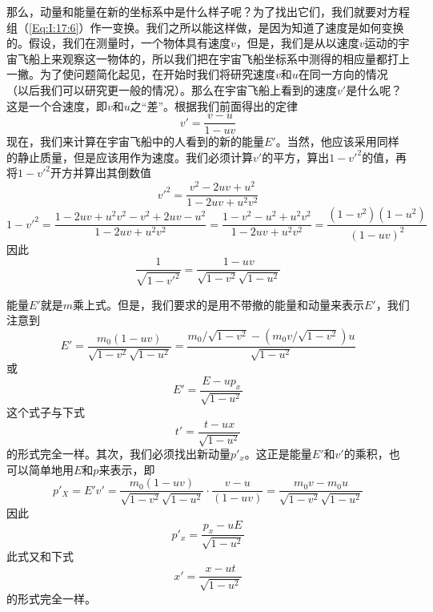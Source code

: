 那么，动量和能量在新的坐标系中是什么样子呢？为了找出它们，我们就要对方程组（\ref{Eq:I:17:6}）作一变换。我们之所以能这样做，是因为知道了速度是如何变换的。假设，我们在测量时，一个物体具有速度$v$，但是，我们是从以速度$v$运动的宇宙飞船上来观察这一物体的，所以我们把在宇宙飞船坐标系中测得的相应量都打上一撇。为了使问题简化起见，在开始时我们将研究速度$v$和$u$在同一方向的情况（以后我们可以研究更一般的情况）。那么在宇宙飞船上看到的速度$v'$是什么呢？这是一个合速度，即$v$和$u$之“差”。根据我们前面得出的定律
\begin{equation}
    \label{Eq:I:17:8}
    v'=\frac{v-u}{1-uv}
\end{equation}
现在，我们来计算在宇宙飞船中的人看到的新的能量$E'$。当然，他应该采用同样的静止质量，但是应该用作为速度。我们必须计算$v'$的平方，算出$1-v'^2$的值，再将$1-v'^2$开方并算出其倒数值
\begin{equation*}
    v'^2=\frac{v^2-2uv+u^2}{1-2uv+u^2v^2}
\end{equation*}
\begin{equation*}
    1-v'^2=\frac{1-2uv+u^2v^2-v^2+2uv-u^2}{1-2uv+u^2v^2}=\frac{1-v^2-u^2+u^2v^2}{1-2uv+u^2v^2}=\frac{(1-v^2)(1-u^2)}{(1-uv)^2}
\end{equation*}
因此
\begin{equation}
    \label{Eq:I:17:9}
    \frac{1}{\sqrt{1-v'^2}}=\frac{1-uv}{\sqrt{1-v^2}\sqrt{1-u^2}}
\end{equation}

能量$E'$就是$m$乘上式。但是，我们要求的是用不带撤的能量和动量来表示$E'$，我们注意到
\begin{equation*}
    E'=\frac{m_0(1-uv)}{\sqrt{1-v^2}\sqrt{1-u^2}}=\frac{m_0/\sqrt{1-v^2}-(m_0v/\sqrt{1-v^2})u}{\sqrt{1-u^2}}
\end{equation*}
或
\begin{equation}
    \label{Eq:I:17:10}
    E'=\frac{E-up_x}{\sqrt{1-u^2}}
\end{equation}
这个式子与下式
\begin{equation*}
    t'=\frac{t-ux}{\sqrt{1-u^2}}
\end{equation*}
的形式完全一样。其次，我们必须找出新动量$p'_x$。这正是能量$E'$和$v'$的乘积，也可以简单地用$E$和$p$来表示，即
\begin{equation*}
    p'_X=E'v'=\frac{m_0(1-uv)}{\sqrt{1-v^2}\sqrt{1-u^2}} \cdot \frac{v-u}{(1-uv)}=\frac{m_0v-m_0u}{\sqrt{1-v^2}\sqrt{1-u^2}}
\end{equation*}
因此
\begin{equation}
    \label{Eq:I:17:11}
    p'_x=\frac{p_x-uE}{\sqrt{1-u^2}}
\end{equation}
此式又和下式
\begin{equation*}
    x'=\frac{x-ut}{\sqrt{1-u^2}}
\end{equation*}
的形式完全一样。

